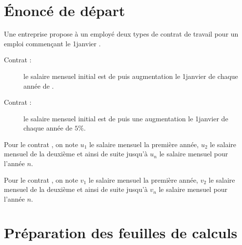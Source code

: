 \documentclass[10pt,french]{article}
\begin{document}
\begin{center}
\end{center}\bigskip

\section*{\'Enoncé de départ}

Une entreprise propose à un employé deux types de contrat de travail pour un emploi commençant le 1\ier janvier .\par
\begin{description}
    \item[Contrat  :] le salaire mensuel initial est de  puis augmentation le 1\ier janvier de chaque année de .
    \item[Contrat  :] le salaire mensuel initial est de  puis une augmentation le 1\ier janvier de chaque année de $5\%$.
\end{description}
Pour le contrat , on note $u_1$ le salaire mensuel la première année, $u_2$ le salaire mensuel de la deuxième et ainsi de suite jusqu'à $u_n$ le salaire mensuel pour l'année $n$.\par
Pour le contrat , on note $v_1$ le salaire mensuel la première année, $v_2$ le salaire mensuel de la deuxième et ainsi de suite jusqu'à $v_n$ le salaire mensuel pour l'année $n$.\par

\section*{Préparation des feuilles de calculs}
\end{document}
